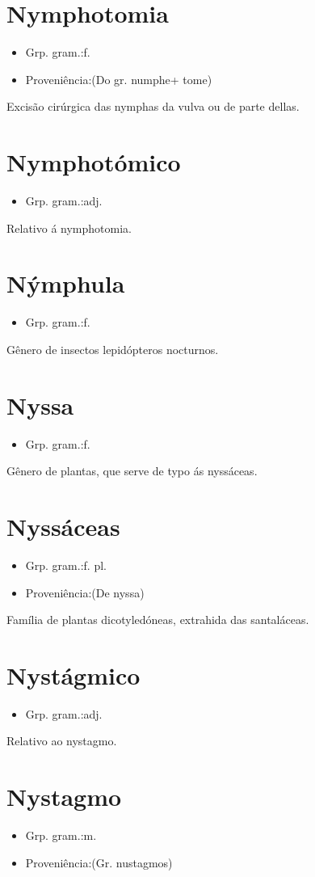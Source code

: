 \section{Nymphotomia}
\begin{itemize}
\item {Grp. gram.:f.}
\end{itemize}
\begin{itemize}
\item {Proveniência:(Do gr. \textunderscore numphe\textunderscore  + \textunderscore tome\textunderscore )}
\end{itemize}
Excisão cirúrgica das nymphas da vulva ou de parte dellas.
\section{Nymphotómico}
\begin{itemize}
\item {Grp. gram.:adj.}
\end{itemize}
Relativo á nymphotomia.
\section{Nýmphula}
\begin{itemize}
\item {Grp. gram.:f.}
\end{itemize}
Gênero de insectos lepidópteros nocturnos.
\section{Nyssa}
\begin{itemize}
\item {Grp. gram.:f.}
\end{itemize}
Gênero de plantas, que serve de typo ás nyssáceas.
\section{Nyssáceas}
\begin{itemize}
\item {Grp. gram.:f. pl.}
\end{itemize}
\begin{itemize}
\item {Proveniência:(De \textunderscore nyssa\textunderscore )}
\end{itemize}
Família de plantas dicotyledóneas, extrahida das santaláceas.
\section{Nystágmico}
\begin{itemize}
\item {Grp. gram.:adj.}
\end{itemize}
Relativo ao nystagmo.
\section{Nystagmo}
\begin{itemize}
\item {Grp. gram.:m.}
\end{itemize}
\begin{itemize}
\item {Proveniência:(Gr. \textunderscore nustagmos\textunderscore )}
\end{itemize}
